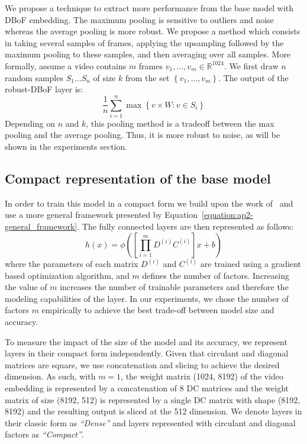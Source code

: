 We propose a technique to extract more performance from the base model with DBoF embedding.
The maximum pooling is sensitive to outliers and noise whereas the average pooling is more robust.
We propose a method which consists in taking several samples of frames, applying the upsampling followed by the maximum pooling to these samples, and then averaging over all samples.
More formally, assume a video contains $m$ frames $v_{1},\ldots,v_{m}\in\mathbb{R}^{1024}$.
We first draw $n$ random samples $S_{1}\ldots S_{n}$ of size $k$ from the set $\left\{ v_{1},\ldots,v_{m}\right\} $.
The output of the robust-DBoF layer is:
\begin{equation}
  \frac{1}{n}\sum_{i=1}^{n}\max\left\{ v\times W:v\in S_{i}\right\} 
\end{equation}
\noindent
Depending on $n$ and $k$, this pooling method is a tradeoff between the max pooling and the average pooling.
Thus, it is more robust to noise, as will be shown in the experiments section.


\subsection{Compact representation of the base model}
\label{subsection:ap2-compact}

In order to train this model in a compact form we build upon the work of~\cite{cheng} and use a more general framework presented by  Equation~\ref{equation:ap2-general_framework}.
The fully connected layers are then represented as follows:
\begin{equation}
  h(x) = \phi\left(\left[\prod_{i=1}^{m} D^{(i)} C^{(i)}\right]x + b\right)
\end{equation}
where the parameters of each matrix $D^{(i)}$ and $C^{(i)}$ are trained using a gradient based optimization algorithm, and $m$ defines the number of factors.
Increasing the value of $m$ increases the number of trainable parameters and therefore the modeling capabilities of the layer.
In our experiments, we chose the number of factors $m$ empirically to achieve the best trade-off between model size and accuracy.

To measure the impact of the size of the model and its accuracy, we represent layers in their compact form independently.
Given that circulant and diagonal matrices are square, we use concatenation and slicing to achieve the desired dimension.
As such, with $m=1$, the weight matrix (1024, 8192) of the video embedding is represented by a concatenation of 8 DC matrices and the weight matrix of size (8192, 512) is represented by a single DC matrix with shape (8192, 8192) and the resulting output is sliced at the 512 dimension.
We denote layers in their classic form as \emph{``Dense''} and layers represented with circulant and diagonal factors as \emph{``Compact''}.

